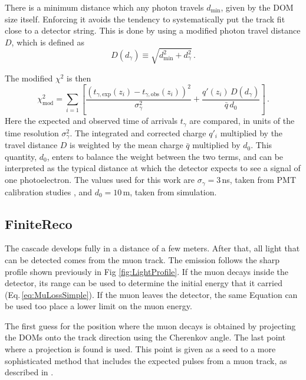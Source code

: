 \documentclass[../Main.tex]{subfiles}
\begin{document}
There is a minimum distance which any photon travels $d_\mathrm{min}$, given by the DOM size itself. Enforcing it avoids the tendency to systematically put the track fit close to a detector string. This is done by using a modified photon travel distance $D$, which is defined as
\begin{equation}
 D(d_\gamma) \equiv \sqrt{d_\mathrm{min}^2 + d_\gamma^2}\,.
\end{equation}

The modified $\chi^2$ is then
\begin{equation}
\chi^2_\mathrm{mod} = \sum_{i=1} \left[ \frac{(t_{\gamma, \mathrm{exp}}(z_i) - t_{\gamma,\mathrm{obs}} (z_i))^2}{\sigma_\gamma^2} + \frac{q'(z_i)\,D(d_\gamma)}{\bar{q}\,d_0}\right]\,.
\label{eq:mod_chi2}
\end{equation}
Here the expected and observed time of arrivals $t_\gamma$ are compared, in units of the time resolution $\sigma_\gamma^2$. The integrated and corrected charge $q'_i$ multiplied by the travel distance $D$ is weighted by the mean charge $\bar{q}$ multiplied by $d_0$. This quantity, $d_0$, enters to balance the weight between the two terms, and can be interpreted as the typical distance at which the detector expects to see a signal of one photoelectron. The values used for this work are $\sigma_\gamma = 3$\,ns, taken from PMT calibration studies \cite{icecube_pmt}, and $d_0 = 10$\,m, taken from simulation.

\subsection{FiniteReco}\label{sec:FiniteReco}
The cascade develops fully in a distance of a few meters. After that, all light that can be detected comes from the muon track. The emission follows the sharp profile shown previously in Fig \ref{fig:LightProfile}. If the muon decays inside the detector, its range can be used to determine the initial energy that it carried (Eq.\,\ref{eq:MuLossSimple}). If the muon leaves the detector, the same Equation can be used too place a lower limit on the muon energy.

The first guess for the position where the muon decays is obtained by projecting the DOMs onto the track direction using the Cherenkov angle. The last point where a projection is found is used. This point is given as a seed to a more sophisticated method that includes the expected pulses from a muon track, as described in \cite{freco}.
\end{document}
